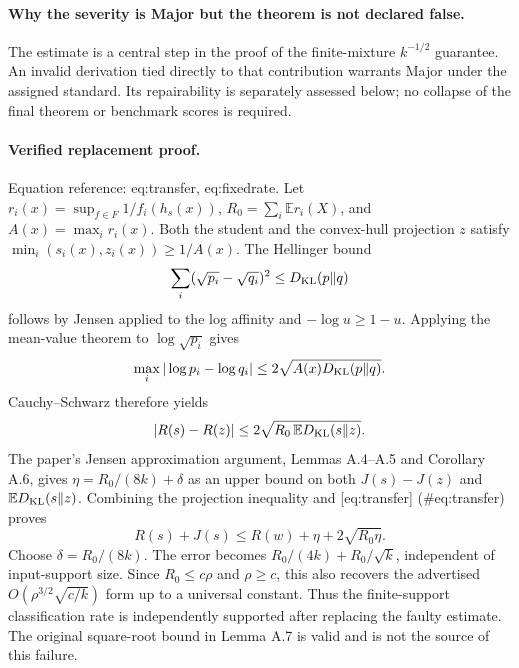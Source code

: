 \documentclass[10pt]{article}
\begin{document}
\paragraph*{Why the severity is Major but the theorem is not declared false.}\mbox{}\par
The estimate is a central step in the proof of the finite-mixture \(k^{-1/2}\) guarantee. An invalid derivation tied directly to that contribution warrants Major under the assigned standard. Its repairability is separately assessed below; no collapse of the final theorem or benchmark scores is required.\par
\paragraph*{Verified replacement proof.}\mbox{}\par
Equation reference: eq:transfer, eq:fixedrate. Let \(r_i(x)=\sup_{f\in F}1/f_i(h_s(x))\), \(R_0=\sum_i\mathbb E r_i(X)\), and \(A(x)=\max_i r_i(x)\). Both the student and the convex-hull projection \(z\) satisfy \(\min_i(s_i(x),z_i(x))\geq1/A(x)\). The Hellinger bound \[\sum_i(\sqrt{p_i}-\sqrt{q_i})^2\leq D_{\rm KL}(p\|q)\] follows by Jensen applied to the log affinity and \(-\log u\geq1-u\). Applying the mean-value theorem to \(\log\sqrt{p_i}\) gives \[\max_i|\log p_i-\log q_i|
 \leq2\sqrt{A(x)D_{\rm KL}(p\|q)}.\] Cauchy–Schwarz therefore yields \[|R(s)-R(z)|
 \leq2\sqrt{R_0\,\mathbb E D_{\rm KL}(s\|z)}.
 \] The paper’s Jensen approximation argument, Lemmas A.4–A.5 and Corollary A.6, gives \(\eta=R_0/(8k)+\delta\) as an upper bound on both \(J(s)-J(z)\) and \(\mathbb E D_{\rm KL}(s\|z)\). Combining the projection inequality and [eq:transfer] (\#eq:transfer) proves \[R(s)+J(s)\leq R(w)+\eta+2\sqrt{R_0\eta}.
 \] Choose \(\delta=R_0/(8k)\). The error becomes \(R_0/(4k)+R_0/\sqrt{k}\), independent of input-support size. Since \(R_0\leq c\rho\) and \(\rho\geq c\), this also recovers the advertised \(O(\rho^{3/2}\sqrt{c/k})\) form up to a universal constant. Thus the finite-support classification rate is independently supported after replacing the faulty estimate. The original square-root bound in Lemma A.7 is valid and is not the source of this failure.\par
\end{document}
